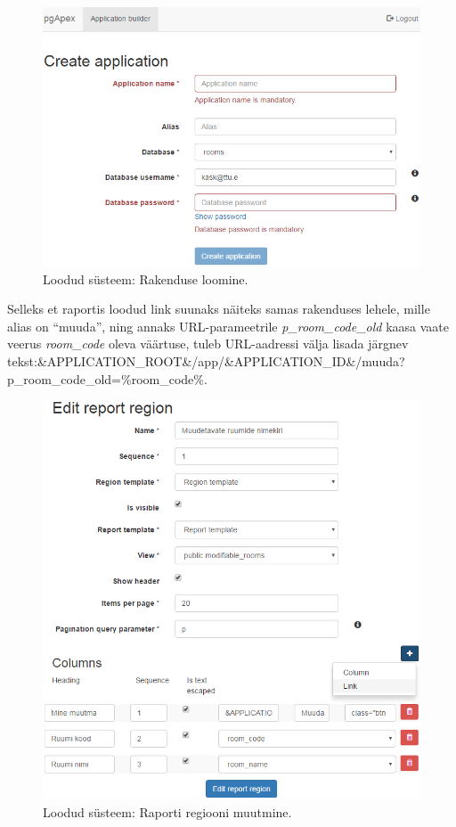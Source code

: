 \documentclass[a4paper,12pt]{article} %
\begin{document}
\begin{figure}[H]
\centering
\includegraphics[width=\textwidth]{./diagrams/pgapex-create-application.png}
\caption{Loodud süsteem: Rakenduse loomine.}
\label{fig_loodud_süsteem_rakenduse_loomine}
\end{figure}
\pagebreak

Selleks et raportis loodud link suunaks näiteks samas rakenduses lehele, mille alias on ``muuda'', ning annaks URL-parameetrile \textit{p\_room\_code\_old} kaasa vaate veerus \textit{room\_code} oleva väärtuse, tuleb URL-aadressi välja lisada järgnev tekst:\newline \&APPLICATION\_ROOT\&/app/\&APPLICATION\_ID\&/muuda?p\_room\_code\_old=\%room\_code\%.
\begin{figure}[H]
\centering
\includegraphics[width=\textwidth]{./diagrams/pgapex-edit-report-region.png}
\caption{Loodud süsteem: Raporti regiooni muutmine.}
\label{fig_loodud_süsteem_raporti_regiooni_muutmine}
\end{figure}
\end{document}
